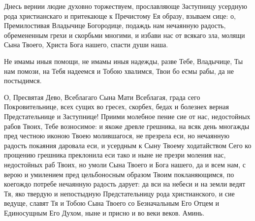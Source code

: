 \begin{mymulticols}
\end{mymulticols}

\mychapterending

\begin{mymulticols}


Днесь вернии людие духовно торжествуем, прославляюще Заступницу усердную рода христианскаго и притекающе к Пречистому Ея образу, взываем сице: о, Премилостивая Владычице Богородице, подаждь нам нечаянную радость, обремененным грехи и скорбьми многими, и избави нас от всякаго зла, молящи Сына Твоего, Христа Бога нашего, спасти души наша.


Не имамы иныя помощи, не имамы иныя надежды, разве Тебе, Владычице, Ты нам помози, на Тебя надеемся и Тобою хвалимся, Твои бо есмы рабы, да не постыдимся.


О, Пресвятая Дево, Всеблагаго Сына Мати Всеблагая, града сего Покровительнице, всех сущих во гресех, скорбех, бедах и болезнех верная Предстательнице и Заступнице! Приими молебное пение сие от нас, недостойных рабов Твоих, Тебе возносимое: и якоже древле грешника, на всяк день многажды пред честною иконою Твоею молившагося, не презрела еси, но нечаянную радость покаяния даровала еси, и усердным к Сыну Твоему ходатайством Сего ко прощению грешника преклонила еси тако и ныне не презри моления нас, недостойных раб Твоих, но умоли Сына Твоего и Бога нашего, да и всем нам, с верою и умилением пред цельбоносным образом Твоим покланяющимся, по коегождо потребе нечаянную радость дарует: да вси на небеси и на земли ведят Тя, яко твердую и непостыдную Предстательницу рода христианского, и сие ведуще, славят Тя и Тобою Сына Твоего со Безначальным Его Отцем и Единосущным Его Духом, ныне и присно и во веки веков. Аминь.

\end{mymulticols}

\mychapterending

